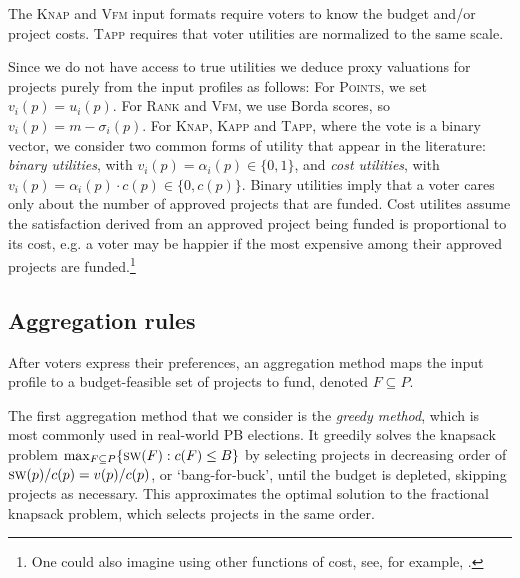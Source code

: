 \documentclass[mnsc,blindrev]{informs3_freeuse} %
\newcommand{\points}{\textsc{Points}}
\renewcommand{\rank}{\textsc{Rank}}
\newcommand{\vfm}{\textsc{Vfm}}
\newcommand{\knap}{\textsc{Knap}}
\newcommand{\kapp}{\textsc{Kapp}}
\newcommand{\tapp}{\textsc{Tapp}}
\newcommand{\sw}{\textsc{sw}}
\begin{document}
The \knap{} and \vfm{} input formats require voters to know the budget and/or project costs.   \tapp{}  requires that voter utilities are normalized to the same scale.   
 
 Since we do not have access to true utilities  we deduce proxy valuations for projects  purely from the input profiles as follows:
For \points{}, we set $v_i(p) = u_i(p).$ 
 For \rank{} and \vfm{}, we use Borda scores, so $v_i(p) = m - \sigma_i(p)$. 
 For \knap{}, \kapp{} and \tapp{}, where the vote is a binary vector, we consider two common forms of utility that appear in the literature: \emph{binary utilities}, with $v_i(p) = \alpha_i(p) \in \{0,1\}$, and \emph{cost utilities}, with $v_i(p) = \alpha_i(p)\cdot c(p) \in \{0,c(p)\}$. Binary utilities imply that a voter  cares only about the number of approved projects that are funded. Cost utilites assume the satisfaction derived from an approved project being funded is proportional to its cost, e.g. a voter may be happier if the most expensive among their approved projects are funded.\footnote{One could also imagine using other functions of cost, see, for example, \citep{brill2023proportionality}.} 
 

 \subsection{Aggregation rules} \label{sec:agg_pre}

After voters express their preferences, an aggregation method maps the input profile to a budget-feasible set of projects to fund, denoted $F\subseteq P$. 

The first aggregation method that we consider is the \emph{greedy method}, which is most commonly used in real-world PB elections. 
 It greedily solves the knapsack problem $\max_{F\subseteq P}\{\sw(F): c(F)\leq B\}$ by selecting  projects in  decreasing order 
of $\sw(p)/c(p) = v(p)/c(p)$, or `bang-for-buck',  until the budget is depleted, skipping projects as necessary. This approximates the optimal solution to the fractional knapsack problem, which selects projects in the same order. 
\end{document}
